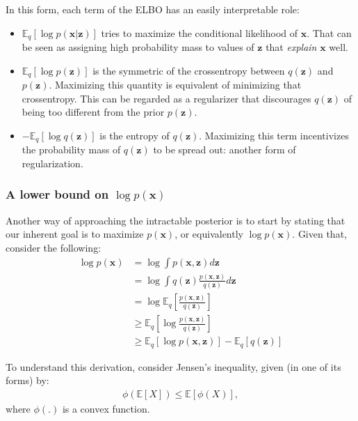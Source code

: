 In this form, each term of the ELBO has an easily interpretable role:
\begin{itemize}
    \item $\mathbb{E}_q [\log p(\bm{x}|\bm{z})]$ tries to maximize the conditional likelihood of $\bm{x}$. That
        can be seen as assigning high probability mass to values of $\bm{z}$ that \emph{explain} $\bm{x}$
        well.
    \item $\mathbb{E}_q [\log p(\bm{z})]$ is the symmetric of the crossentropy between
        $q(\bm{z})$ and $p(\bm{z})$. Maximizing this quantity is equivalent of minimizing
        that crossentropy. This can be regarded as a regularizer that discourages
        $q(\bm{z})$ of being too different from the prior $p(\bm{z})$.
    \item $ - \mathbb{E}_q [\log q(\bm{z})]$ is the entropy of $q(\bm{z})$. Maximizing
        this term incentivizes the probability mass of $q(\bm{z})$ to be spread out:
        another form of regularization.
\end{itemize}

\subsubsection{A lower bound on $\log p(\bm{x})$}
\label{subsubsection:elbo}

Another way of approaching the intractable posterior is to start by stating
that our inherent goal is to maximize $p(\bm{x})$, or equivalently $\log p(\bm{x})$. Given
that, consider the following:
\begin{align}
    \log p(\bm{x}) &= \log \int p(\bm{x}, \bm{z}) d\bm{z}\\
    &= \log \int q(\bm{z}) \frac{p(\bm{x}, \bm{z})}{q(\bm{z})} d\bm{z} \\
    &= \log \mathbb{E}_q[\frac{p(\bm{x}, \bm{z})}{q(\bm{z})}] \label{eq:elbojensen1} \\
    &\geq \mathbb{E}_q[\log \frac{p(\bm{x}, \bm{z})}{q(\bm{z})}] \label{eq:elbojensen2} \\
    &\geq \mathbb{E}_q[\log p(\bm{x}, \bm{z})] - \mathbb{E}_q[q(\bm{z})] \label{eq:elbojensen3}
\end{align}

To understand this derivation, consider Jensen's inequality, given (in one of
its forms) by:
\begin{align}
    \phi(\mathbb{E}[X]) \leq \mathbb{E}[\phi(X)], \label{eq:jensen}
\end{align} where $\phi(.)$ is a convex function.

